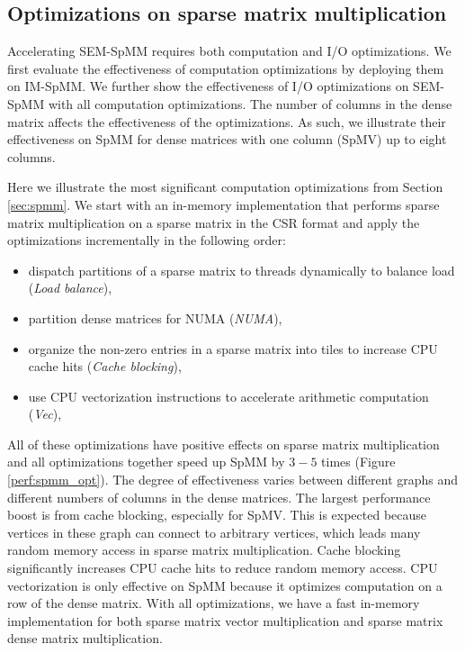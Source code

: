 \subsection{Optimizations on sparse matrix multiplication} \label{sec:opts}
Accelerating SEM-SpMM requires both computation and I/O optimizations.
We first evaluate the effectiveness of computation optimizations by deploying
them on IM-SpMM. We further show the effectiveness of I/O optimizations on
SEM-SpMM with all computation optimizations. The number of columns in
the dense matrix affects the effectiveness of the optimizations. As such,
we illustrate their effectiveness on SpMM for dense matrices with one column (SpMV)
up to eight columns.

Here we illustrate the most significant computation optimizations from Section
\ref{sec:spmm}. We start with an in-memory implementation that
performs sparse matrix multiplication on a sparse matrix in the CSR format
and apply the optimizations incrementally in the following order:
\begin{itemize} \itemsep1pt \parskip0pt 
	\item dispatch partitions of a sparse matrix to threads dynamically
		to balance load (\textit{Load balance}),
	\item partition dense matrices for NUMA (\textit{NUMA}),
	\item organize the non-zero entries in a sparse matrix into tiles to
		increase CPU cache hits (\textit{Cache blocking}),
	\item use CPU vectorization instructions to accelerate arithmetic
		computation (\textit{Vec}),
\end{itemize}

All of these optimizations have positive effects on sparse matrix
multiplication and all optimizations together speed up SpMM by $3-5$ times
(Figure \ref{perf:spmm_opt}). The degree of effectiveness
varies between different graphs and different numbers of columns in
the dense matrices. The largest performance boost is from cache blocking,
especially for SpMV. This is expected because vertices in these graph can
connect to arbitrary vertices, which leads many random memory access in sparse matrix
multiplication. Cache blocking significantly increases CPU cache hits to reduce
random memory access. CPU vectorization is only effective on SpMM because
it optimizes computation on a row of the dense matrix.
With all optimizations, we have a fast in-memory implementation for both
sparse matrix vector multiplication and sparse matrix dense matrix multiplication.

